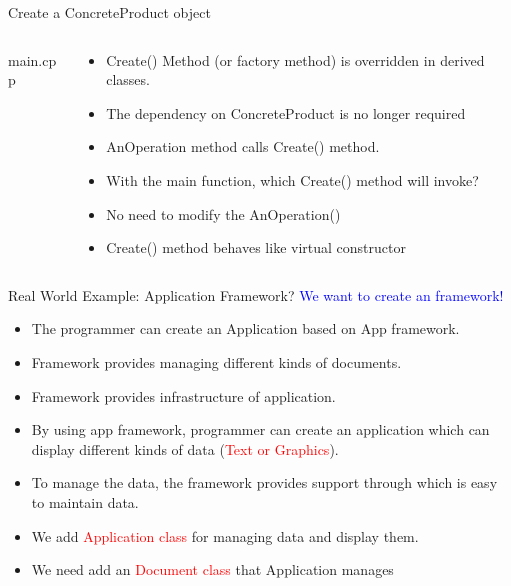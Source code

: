 \documentclass[13pt]{beamer}
\begin{document}
\begin{frame}{Create a ConcreteProduct object}
\begin{columns}[T]
\begin{column}{.4\textwidth}
\lstset{basicstyle=\tiny,style=myCustomCppStyle}
main.cpp

\end{column}
\begin{column}{.6\textwidth}
	\begin{itemize}
		\setlength\itemsep{1em}
		\item Create() Method (or factory method) is overridden in derived classes.
		\item The dependency on ConcreteProduct is no longer required
		\item AnOperation method calls Create() method.
		\item With the main function, which Create() method will invoke?
		\item No need to modify the AnOperation()
		\item Create() method behaves like virtual constructor
	\end{itemize}
\end{column}
\end{columns}
\end{frame}

\begin{frame}{Real World Example: Application Framework?}
	\textcolor{blue}{We want to create an framework!}	
	\begin{itemize}
		\setlength\itemsep{1em}
		\item The programmer can create an Application based on App framework.
		\item Framework provides managing different kinds of documents.
		\item Framework provides infrastructure of application.
		\item By using app framework, programmer can create an application which can display different kinds of data (\textcolor{red}{Text or Graphics}).
		\item To manage the data, the framework provides support through which is easy to maintain data.
		\item We add \textcolor{red}{Application class} for managing data and display them.
		\item We need add an \textcolor{red}{Document class} that Application manages
	\end{itemize}
\end{frame}
\end{document}

